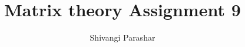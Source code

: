 \documentclass[journal,12pt,twocolumn]{IEEEtran}
\begin{document}
\makeatletter
{}
\makeatother
\let\StandardTheFigure\thefigure
\let\vec\mathbf
\renewcommand{\thefigure}{\theproblem}
\def\putbox#1#2#3{\makebox[0in][l]{\makebox[#1][l]{}\raisebox{\baselineskip}[0in][0in]{\raisebox{#2}[0in][0in]{#3}}}}
     \def\rightbox#1{\makebox[0in][r]{#1}}
     \def\centbox#1{\makebox[0in]{#1}}
     \def\topbox#1{\raisebox{-\baselineskip}[0in][0in]{#1}}
     \def\midbox#1{\raisebox{-0.5\baselineskip}[0in][0in]{#1}}
\vspace{3cm}
\title{Matrix theory Assignment 9}
\author{Shivangi Parashar}
%
%
%
% 
%
\end{document}
